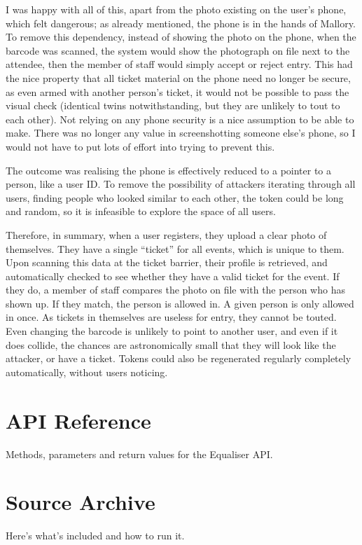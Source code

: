 \documentclass[12pt]{bhamdissertation}
\begin{document}
I was happy with all of this, apart from the photo existing on the user's phone, which felt dangerous; as already mentioned, the phone is in the hands of Mallory. To remove this dependency, instead of showing the photo on the phone, when the barcode was scanned, the system would show the photograph on file next to the attendee, then the member of staff would simply accept or reject entry. This had the nice property that all ticket material on the phone need no longer be secure, as even armed with another person's ticket, it would not be possible to pass the visual check (identical twins notwithstanding, but they are unlikely to tout to each other). Not relying on any phone security is a nice assumption to be able to make. There was no longer any value in screenshotting someone else's phone, so I would not have to put lots of effort into trying to prevent this.

The outcome was realising the phone is effectively reduced to a pointer to a person, like a user ID. To remove the possibility of attackers iterating through all users, finding people who looked similar to each other, the token could be long and random, so it is infeasible to explore the space of all users.

Therefore, in summary, when a user registers, they upload a clear photo of themselves. They have a single ``ticket'' for all events, which is unique to them. Upon scanning this data at the ticket barrier, their profile is retrieved, and automatically checked to see whether they have a valid ticket for the event. If they do, a member of staff compares the photo on file with the person who has shown up. If they match, the person is allowed in. A given person is only allowed in once. As tickets in themselves are useless for entry, they cannot be touted. Even changing the barcode is unlikely to point to another user, and even if it does collide, the chances are astronomically small that they will look like the attacker, or have a ticket. Tokens could also be regenerated regularly completely automatically, without users noticing.

\appendix
\begin{appendices}


\chapter{API Reference}
\label{appendix:api_reference}

Methods, parameters and return values for the Equaliser API.

\chapter{Source Archive}
\label{appendix:source_archive}

Here's what's included and how to run it.

\end{appendices}

\cleardoublepage  %
\printbibliography
\end{document}
